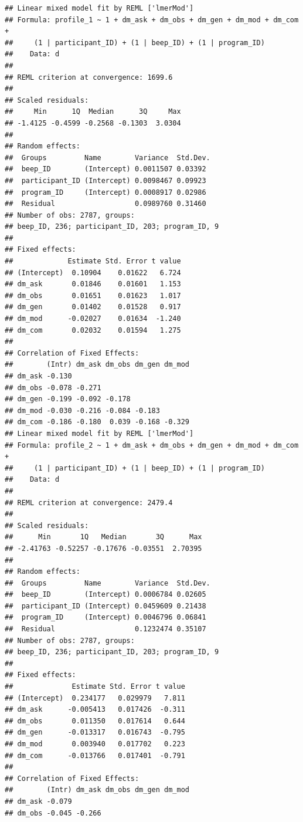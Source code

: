 \documentclass[]{msu-thesis}
\theoremstyle{definition}
\theoremstyle{definition}
\theoremstyle{definition}
\theoremstyle{remark}
\begin{document}
\begin{verbatim}
## Linear mixed model fit by REML ['lmerMod']
## Formula: profile_1 ~ 1 + dm_ask + dm_obs + dm_gen + dm_mod + dm_com +  
##     (1 | participant_ID) + (1 | beep_ID) + (1 | program_ID)
##    Data: d
## 
## REML criterion at convergence: 1699.6
## 
## Scaled residuals: 
##     Min      1Q  Median      3Q     Max 
## -1.4125 -0.4599 -0.2568 -0.1303  3.0304 
## 
## Random effects:
##  Groups         Name        Variance  Std.Dev.
##  beep_ID        (Intercept) 0.0011507 0.03392 
##  participant_ID (Intercept) 0.0098467 0.09923 
##  program_ID     (Intercept) 0.0008917 0.02986 
##  Residual                   0.0989760 0.31460 
## Number of obs: 2787, groups:  
## beep_ID, 236; participant_ID, 203; program_ID, 9
## 
## Fixed effects:
##             Estimate Std. Error t value
## (Intercept)  0.10904    0.01622   6.724
## dm_ask       0.01846    0.01601   1.153
## dm_obs       0.01651    0.01623   1.017
## dm_gen       0.01402    0.01528   0.917
## dm_mod      -0.02027    0.01634  -1.240
## dm_com       0.02032    0.01594   1.275
## 
## Correlation of Fixed Effects:
##        (Intr) dm_ask dm_obs dm_gen dm_mod
## dm_ask -0.130                            
## dm_obs -0.078 -0.271                     
## dm_gen -0.199 -0.092 -0.178              
## dm_mod -0.030 -0.216 -0.084 -0.183       
## dm_com -0.186 -0.180  0.039 -0.168 -0.329
## Linear mixed model fit by REML ['lmerMod']
## Formula: profile_2 ~ 1 + dm_ask + dm_obs + dm_gen + dm_mod + dm_com +  
##     (1 | participant_ID) + (1 | beep_ID) + (1 | program_ID)
##    Data: d
## 
## REML criterion at convergence: 2479.4
## 
## Scaled residuals: 
##      Min       1Q   Median       3Q      Max 
## -2.41763 -0.52257 -0.17676 -0.03551  2.70395 
## 
## Random effects:
##  Groups         Name        Variance  Std.Dev.
##  beep_ID        (Intercept) 0.0006784 0.02605 
##  participant_ID (Intercept) 0.0459609 0.21438 
##  program_ID     (Intercept) 0.0046796 0.06841 
##  Residual                   0.1232474 0.35107 
## Number of obs: 2787, groups:  
## beep_ID, 236; participant_ID, 203; program_ID, 9
## 
## Fixed effects:
##              Estimate Std. Error t value
## (Intercept)  0.234177   0.029979   7.811
## dm_ask      -0.005413   0.017426  -0.311
## dm_obs       0.011350   0.017614   0.644
## dm_gen      -0.013317   0.016743  -0.795
## dm_mod       0.003940   0.017702   0.223
## dm_com      -0.013766   0.017401  -0.791
## 
## Correlation of Fixed Effects:
##        (Intr) dm_ask dm_obs dm_gen dm_mod
## dm_ask -0.079                            
## dm_obs -0.045 -0.266                     

\end{verbatim}
\end{document}
